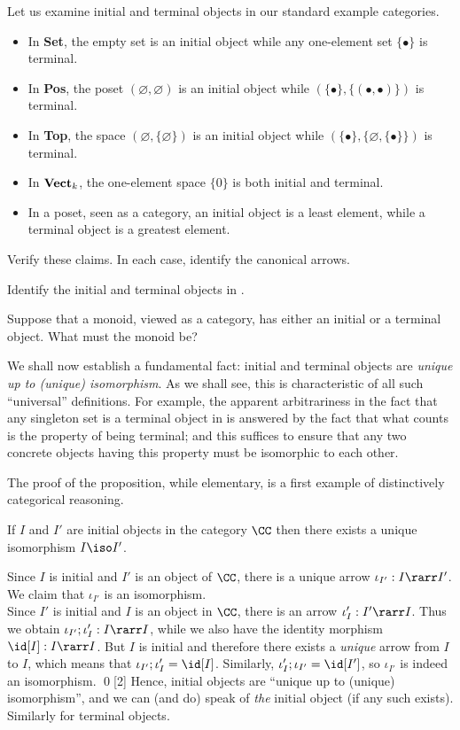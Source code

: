 \documentclass{svmult}
\begin{document}
Let us examine initial and terminal objects in our standard example categories.
\begin{itemize}
\item In \textbf{Set}, the empty set is an initial object while any one-element set $\{\bullet\}$ is terminal.
\item In \textbf{Pos}, the poset $(\varnothing,\varnothing)$ is an initial object while $(\{\bullet\}, \{ (\bullet,\bullet)\})$ is terminal.
\item In \textbf{Top}, the space $(\varnothing,\{\varnothing\})$ is an initial object while $(\{\bullet\},\{\varnothing,\{\bullet\}\})$ is terminal.
\item In $\text{\textbf{Vect}}_k$, the one-element space $\{0\}$ is both initial and terminal.
\item In a poset, seen as a category, an initial object is a least element, while a terminal object is a greatest element.
\end{itemize}
\begin{myexercise}
Verify these claims.
In each case, identify the canonical arrows.
\end{myexercise}
\begin{myexercise}
Identify the initial and terminal objects in .
\end{myexercise}
\begin{myexercise}
Suppose that a monoid, viewed as a category, has either an initial or a terminal object. What must the monoid be?
\end{myexercise}
%
We shall now establish a fundamental fact: initial and terminal objects are \emph{unique up to (unique) isomorphism}. As we shall see, this is characteristic of all such ``universal'' definitions.
For example, the apparent arbitrariness in the fact that any singleton set is a terminal object in  is answered by the fact that what counts is the property of being terminal; and this suffices to ensure that any two concrete objects having this property must be isomorphic to each other.

The proof of the proposition, while elementary, is a first example of distinctively categorical reasoning.
%
\begin{myproposition}
\label{inuniqueprop}
  If $I$ and $I'$ are initial objects in the category $\CC$ then there exists a unique isomorphism $I\iso I'$.
\end{myproposition}
\proof%
Since $I$ is initial and $I'$ is an object of $\CC$, there is a unique arrow $\iota_{I'}:I\rarr I'$. We claim that $\iota_{I'}$ is  an isomorphism.
\\
Since $I'$ is initial and $I$ is an object in $\CC$, there is an arrow $\iota'_I:I'\rarr I$. Thus we obtain $\iota_{I'};\iota'_I:I\rarr I$, while we
also have the identity morphism $\id[I]:I\rarr I$. But $I$ is initial and therefore there exists a \emph{unique} arrow from $I$ to $I$, which means that
$\iota_{I'};\iota'_I=\id[I]$. Similarly, $\iota'_{I};\iota_{I'}=\id[I']$, so $\iota_{I'}$ is indeed an isomorphism. \qed[2]
%
Hence, initial objects are ``unique up to (unique) isomorphism'', and we can (and do) speak of \emph{the} initial object (if any such exists). Similarly for terminal objects.
\end{document}
